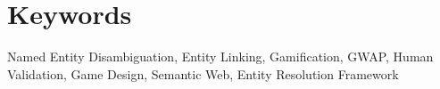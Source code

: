 
\section{Keywords}
Named Entity Disambiguation, Entity Linking, Gamification, GWAP, Human Validation, Game Design, Semantic Web, Entity Resolution Framework

